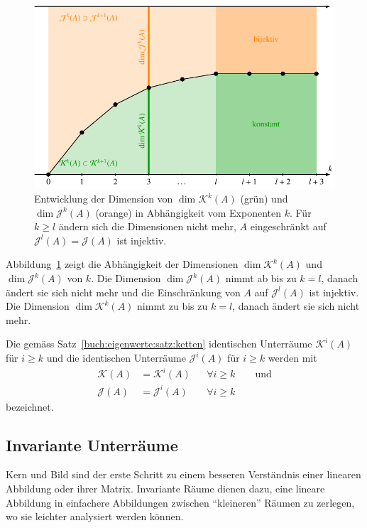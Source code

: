 \begin{figure}
\centering
\includegraphics{chapters/40-eigenwerte/images/dimjk.pdf}
\caption{Entwicklung der Dimension von $\dim\mathcal{K}^k(A)$ (grün)
und $\dim\mathcal{J}^k(A)$ (orange) in Abhängigkeit vom Exponenten $k$.
Für $k\ge l$ ändern sich die Dimensionen nicht mehr, $A$ eingeschränkt
auf $\mathcal{J}^l(A)=\mathcal{J}(A)$ ist injektiv.
\label{buch:eigenwerte:fig:dimjk}}
\end{figure}

Abbildung~\ref{buch:eigenwerte:fig:dimjk} zeigt die Abhängigkeit der
Dimensionen $\dim\mathcal{K}^k(A)$ und $\dim\mathcal{J}^k(A)$ von $k$.
Die Dimension $\dim\mathcal{J}^k(A)$ nimmt ab bis zu $k=l$, danach ändert
sie sich nicht mehr und die Einschränkung von $A$ auf $\mathcal{J}^l(A)$ 
ist injektiv.
Die Dimension $\dim\mathcal{K}^k(A)$ nimmt zu bis zu $k=l$, danach
ändert sie sich nicht mehr.

\begin{definition}
\label{buch:eigenwerte:def:KundJ}
Die gemäss Satz~\ref{buch:eigenwerte:satz:ketten} identischen Unterräume
$\mathcal{K}^i(A)$ für $i\ge k$ und die identischen Unterräume
$\mathcal{J}^i(A)$ für $i\ge k$ werden mit
\[
\begin{aligned}
\mathcal{K}(A) &= \mathcal{K}^i(A)&&\forall i\ge k \qquad\text{und}
\\
\mathcal{J}(A) &= \mathcal{J}^i(A)&&\forall i\ge k
\end{aligned}
\]
bezeichnet.
\end{definition}


%
%
\subsection{Invariante Unterräume
\label{buch:subsection:invariante-unterraeume}}
Kern und Bild sind der erste Schritt zu einem besseren Verständnis 
einer linearen Abbildung oder ihrer Matrix.
Invariante Räume dienen dazu, eine lineare Abbildung in einfachere
Abbildungen zwischen ``kleineren'' Räumen zu zerlegen, wo sie leichter
analysiert werden können.

